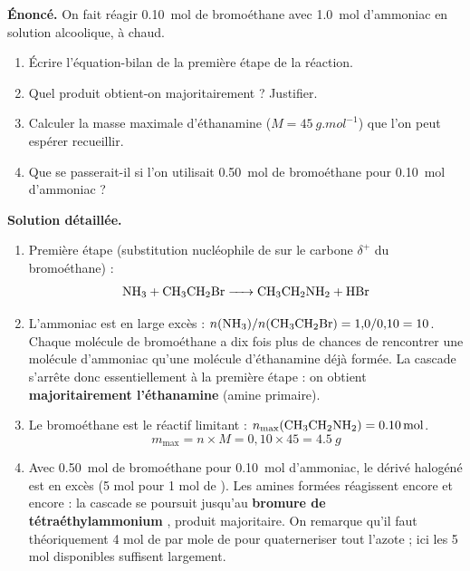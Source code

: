 \documentclass[11pt]{article}
\begin{document}
\begin{exoresolu}
\textbf{Énoncé.} On fait réagir \SI{0,10}{mol} de bromoéthane  avec \SI{1,0}{mol} d'ammoniac en solution alcoolique, à chaud.
\begin{enumerate}
\item Écrire l'équation-bilan de la première étape de la réaction.
\item Quel produit obtient-on majoritairement ? Justifier.
\item Calculer la masse maximale d'éthanamine ($M = \SI{45}{g.mol^{-1}}$) que l'on peut espérer recueillir.
\item Que se passerait-il si l'on utilisait \SI{0,50}{mol} de bromoéthane pour \SI{0,10}{mol} d'ammoniac ?
\end{enumerate}
\tcblower
\textbf{Solution détaillée.}
\begin{enumerate}
\item Première étape (substitution nucléophile de  sur le carbone $\delta^+$ du bromoéthane) :
\[ \ce{NH3 + CH3CH2Br -> CH3CH2NH2 + HBr} \]
\item L'ammoniac est en large excès : $n(\ce{NH3})/n(\ce{CH3CH2Br}) = 1{,}0/0{,}10 = 10$. Chaque molécule de bromoéthane a dix fois plus de chances de rencontrer une molécule d'ammoniac qu'une molécule d'éthanamine déjà formée. La cascade s'arrête donc essentiellement à la première étape : on obtient \textbf{majoritairement l'éthanamine}  (amine primaire).
\item Le bromoéthane est le réactif limitant : $n_{\max}(\ce{CH3CH2NH2}) = \SI{0,10}{mol}$.
\[ m_{\max} = n \times M = 0{,}10 \times 45 = \SI{4,5}{g} \]
\item Avec \SI{0,50}{mol} de bromoéthane pour \SI{0,10}{mol} d'ammoniac, le dérivé halogéné est en excès (5 mol pour 1 mol de ). Les amines formées réagissent encore et encore : la cascade se poursuit jusqu'au \textbf{bromure de tétraéthylammonium} , produit majoritaire. On remarque qu'il faut théoriquement 4 mol de  par mole de  pour quaterneriser tout l'azote ; ici les 5 mol disponibles suffisent largement.
\end{enumerate}
\end{exoresolu}
\end{document}

